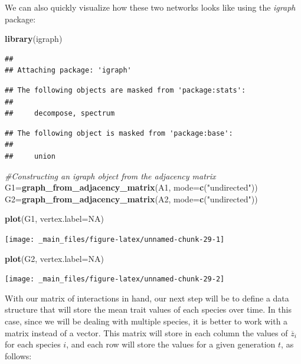 \documentclass[
]{book}
\newenvironment{Shaded}{\begin{snugshade}}{\end{snugshade}}
\newcommand{\AttributeTok}[1]{\textcolor[rgb]{0.13,0.29,0.53}{#1}}
\newcommand{\CommentTok}[1]{\textcolor[rgb]{0.56,0.35,0.01}{\textit{#1}}}
\newcommand{\ConstantTok}[1]{\textcolor[rgb]{0.56,0.35,0.01}{#1}}
\newcommand{\FunctionTok}[1]{\textcolor[rgb]{0.13,0.29,0.53}{\textbf{#1}}}
\newcommand{\NormalTok}[1]{#1}
\newcommand{\OtherTok}[1]{\textcolor[rgb]{0.56,0.35,0.01}{#1}}
\newcommand{\StringTok}[1]{\textcolor[rgb]{0.31,0.60,0.02}{#1}}
\begin{document}
We can also quickly visualize how these two networks looks like using the \emph{igraph} package:

\begin{Shaded}
\begin{Highlighting}[]
\FunctionTok{library}\NormalTok{(igraph)}
\end{Highlighting}
\end{Shaded}

\begin{verbatim}
## 
## Attaching package: 'igraph'
\end{verbatim}

\begin{verbatim}
## The following objects are masked from 'package:stats':
## 
##     decompose, spectrum
\end{verbatim}

\begin{verbatim}
## The following object is masked from 'package:base':
## 
##     union
\end{verbatim}

\begin{Shaded}
\begin{Highlighting}[]
\CommentTok{\#Constructing an igraph object from the adjacency matrix}
\NormalTok{G1}\OtherTok{=}\FunctionTok{graph\_from\_adjacency\_matrix}\NormalTok{(A1, }\AttributeTok{mode=}\FunctionTok{c}\NormalTok{(}\StringTok{"undirected"}\NormalTok{))}
\NormalTok{G2}\OtherTok{=}\FunctionTok{graph\_from\_adjacency\_matrix}\NormalTok{(A2, }\AttributeTok{mode=}\FunctionTok{c}\NormalTok{(}\StringTok{"undirected"}\NormalTok{))}

\FunctionTok{plot}\NormalTok{(G1, }\AttributeTok{vertex.label=}\ConstantTok{NA}\NormalTok{)}
\end{Highlighting}
\end{Shaded}

\texttt{[image: \_main\_files/figure-latex/unnamed-chunk-29-1]}

\begin{Shaded}
\begin{Highlighting}[]
\FunctionTok{plot}\NormalTok{(G2, }\AttributeTok{vertex.label=}\ConstantTok{NA}\NormalTok{)}
\end{Highlighting}
\end{Shaded}

\texttt{[image: \_main\_files/figure-latex/unnamed-chunk-29-2]}

With our matrix of interactions in hand, our next step will be to define a data structure that will store the mean trait values of each species over time. In this case, since we will be dealing with multiple species, it is better to work with a matrix instead of a vector. This matrix will store in each column the values of \(\overline{z}_i\) for each species \(i\), and each row will store the values for a given generation \(t\), as follows:
\end{document}
